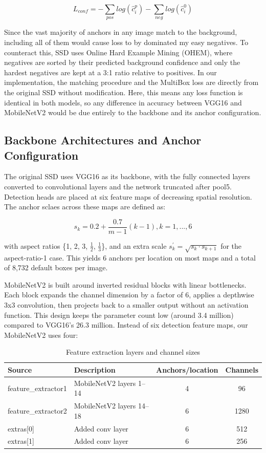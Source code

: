 \documentclass{article}
\begin{document}
\[
L_{conf} = -\sum_{pos}{log(\hat{c}^{p}_{i})} - \sum_{neg}{log(\hat{c}^{0}_{i})}
\]

\qquad Since the vast majority of anchors in any image match to the background, including all of them would cause loss to by dominated my easy negatives. To counteract this, SSD uses Online Hard Example Mining (OHEM), where negatives are sorted by their predicted background confidence and only the hardest negatives are kept at a 3:1 ratio relative to positives. In our implementation, the matching procedure and the MultiBox loss are directly from the original SSD without modification. Here, this means any loss function is identical in both models, so any difference in accuracy between VGG16 and MobileNetV2 would be due entirely to the backbone and its anchor configuration.

\subsection{Backbone Architectures and Anchor Configuration}

\qquad The original SSD uses VGG16 as its backbone, with the fully connected layers converted to convolutional layers and the network truncated after pool5. Detection heads are placed at six feature maps  of decreasing spatial resolution. The anchor sclaes across these maps are defined as:

\[
s_{k} = 0.2 + \frac{0.7}{m - 1}(k - 1), k = 1,..., 6
\]

with aspect ratios \{1, 2, 3, $\frac{1}{2}$, $\frac{1}{3}$\}, and an extra scale $s^{'}_{k} = \sqrt{s_{k} \cdot s_{k + 1}}$ for the aspect-ratio-1 case. This yields 6 anchors per location on most maps and a total of 8,732 default boxes per image.

\qquad MobileNetV2 is built around inverted residual blocks with linear bottlenecks. Each block expands the channel dimension by a factor of 6, applies a depthwise 3x3 convolution, then projects back to a smaller output without an activation function. This design keeps the parameter count low (around 3.4 million) compared to VGG16's 26.3 million. Instead of six detection feature maps, our MobileNetV2 uses four:

\begin{table}[h]
\centering
\begin{tabular}{|l|l|c|c|}
\hline
\textbf{Source} & \textbf{Description} & \textbf{Anchors/location} & \textbf{Channels} \\ \hline
feature\_extractor1 & MobileNetV2 layers 1--14 & 4 & 96 \\ \hline
feature\_extractor2 & MobileNetV2 layers 14--18 & 6 & 1280 \\ \hline
extras[0] & Added conv layer & 6 & 512 \\ \hline
extras[1] & Added conv layer & 6 & 256 \\ \hline
\end{tabular}
\caption{Feature extraction layers and channel sizes}
\label{tab:feature_extractors}
\end{table}
\end{document}
